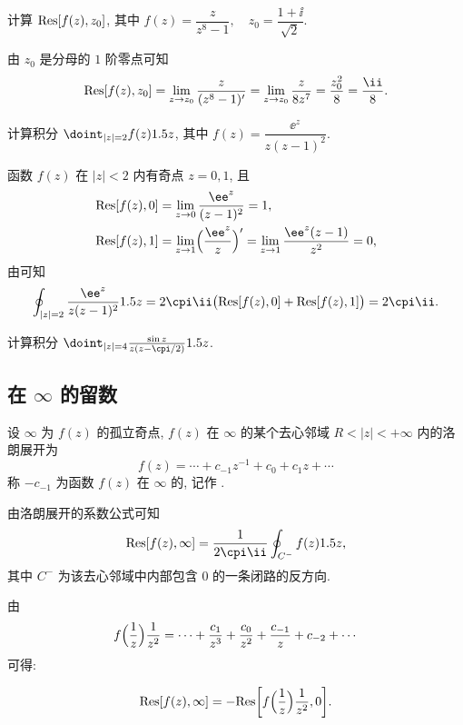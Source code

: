 \begin{example}
  计算 ${\mathrm{Res}}[f(z),z_0]$, 其中 $f(z)=\dfrac{z}{z^8-1},\quad z_0=\dfrac{1+\ii}{\sqrt2}$.
\end{example}

\begin{solution}
  由 $z_0$ 是分母的 $1$ 阶零点可知
  \[
     \Res[f(z),z_0]
    =\lim_{z\ra z_0}\frac z{(z^8-1)'}
    =\lim_{z\ra z_0}\frac z{8z^7}
    =\frac{z_0^2}8
    =\frac\ii8.
  \]
\end{solution}

\begin{example}
  计算积分 $\doint_{|z|=2}f(z)\d z$, 其中 $f(z)=\dfrac{\ee^z}{z(z-1)^2}$.
\end{example}

\begin{solution}
  函数 $f(z)$ 在 $|z|<2$ 内有奇点 $z=0,1$, 且
  \begin{align*}
     \Res[f(z),0]&
    =\lim_{z\ra0}\frac{\ee^z}{(z-1)^2}
    =1,\\
     \Res[f(z),1]&
    =\lim_{z\ra1}\Bigl(\frac{\ee^z}z\Bigr)'
    =\lim_{z\ra1}\frac{\ee^z(z-1)}{z^2}
    =0,
  \end{align*}
  由\thmRes 可知
  \[
    \oint_{|z|=2}\frac{\ee^z}{z(z-1)^2}\d z
    =2\cpi\ii\bigl(\Res[f(z),0]+\Res[f(z),1]\bigr)
    =2\cpi\ii.
  \]
\end{solution}

\begin{exercise}
  计算积分 $\doint_{|z|=4}\frac{\sin z}{z(z-\cpi/2)}\d z$.
\end{exercise}


\subsection{在 \texorpdfstring{$\infty$}{∞} 的留数}

\begin{definition}
  设 $\infty$ 为 $f(z)$ 的孤立奇点, $f(z)$ 在 $\infty$ 的某个去心邻域 $R<|z|<+\infty$ 内的洛朗展开为
  \[
    f(z)=\cdots+c_{-1}z^{-1}+c_0+c_1z+\cdots
  \]
  称 $-c_{-1}$ 为函数 $f(z)$ 在 $\infty$ 的, 记作 \noun{$\Res[f(z),\infty]$}.
\end{definition}

由洛朗展开的系数公式可知
\[
   \Res[f(z),\infty]
  =\frac1{2\cpi\ii}\oint_{C^-}f(z)\d z,
\]
其中 $C^-$ 为该去心邻域中内部包含 $0$ 的一条闭路的反方向.

由
\[
   f\Bigl(\frac1z\Bigr)\frac1{z^2}
  =\cdots+\frac{c_1}{z^3}+\frac{c_0}{z^2}+\frac{c_{-1}}z+c_{-2}+\cdots
\]
可得:
\begin{theorem}[留数计算公式 IV]
  \[
     {\mathrm{Res}}[f(z),\infty]
    =-{\mathrm{Res}}\biggl[f\Bigl(\frac1z\Bigr)\frac1{z^2},0\biggr].
  \]
\end{theorem}

